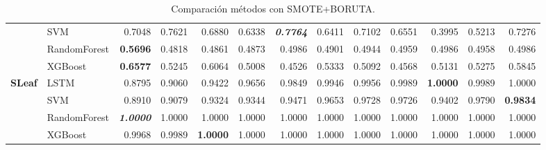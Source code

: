 \begin{table}[H]
\begin{adjustbox}{max width=12cm}
\begin{tabular}{|c|l|r|r|r|r|r|r|r|r|r|r|r|}
			                      & SVM          & 0.7048                   & 0.7621          & 0.6880          & 0.6338          & \textit{\textbf{0.7764}} & 0.6411          & 0.7102 & 0.6551 & 0.3995          & 0.5213                   & 0.7276                   \\
			                      & RandomForest & \textbf{0.5696}          & 0.4818          & 0.4861          & 0.4873          & 0.4986                   & 0.4901          & 0.4944 & 0.4959 & 0.4986          & 0.4958                   & 0.4986                   \\
			                      & XGBoost      & \textbf{0.6577}          & 0.5245          & 0.6064          & 0.5008          & 0.4526                   & 0.5333          & 0.5092 & 0.4568 & 0.5131          & 0.5275                   & 0.5845                   \\
			\hline
			\textbf{SLeaf}        & LSTM         & 0.8795                   & 0.9060          & 0.9422          & 0.9656          & 0.9849                   & 0.9946          & 0.9956 & 0.9989 & \textbf{1.0000} & 0.9989                   & 1.0000                   \\
			                      & SVM          & 0.8910                   & 0.9079          & 0.9324          & 0.9344          & 0.9471                   & 0.9653          & 0.9728 & 0.9726 & 0.9402          & 0.9790                   & \textbf{0.9834}          \\
			                      & RandomForest & \textit{\textbf{1.0000}} & 1.0000          & 1.0000          & 1.0000          & 1.0000                   & 1.0000          & 1.0000 & 1.0000 & 1.0000          & 1.0000                   & 1.0000                   \\
			                      & XGBoost      & 0.9968                   & 0.9989          & \textbf{1.0000} & 1.0000          & 1.0000                   & 1.0000          & 1.0000 & 1.0000 & 1.0000          & 1.0000                   & 1.0000                   \\
			\hline
		\end{tabular}
	\end{adjustbox}
	\caption{Comparación métodos con SMOTE+BORUTA.}
	\label{tab:all_comp_smote_boruta}
\end{table}


